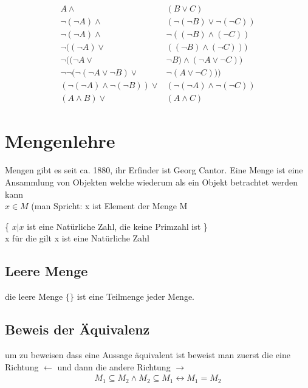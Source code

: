 \documentclass[a4paper]{scrartcl}
\begin{document}
\begin{align*}
A \wedge& (B \vee C) \\
\neg (\neg A) \wedge& (\neg(\neg B) \vee \neg(\neg C ) ) \\
\neg (\neg A) \wedge& \neg((\neg B) \wedge (\neg C ) ) \\
\neg ((\neg A) \vee& ((\neg B) \wedge (\neg C ) ) ) \\
\neg ((\neg A \vee& \neg B) \wedge (\neg A \vee \neg C ) ) \\
\neg \neg ( \neg (\neg A \vee \neg B) \vee& \neg( A \vee \neg C) ) ) \\ 
(\neg (\neg A) \wedge \neg (\neg B) ) \vee& (\neg(\neg A) \wedge \neg (\neg C) ) \\
(A \wedge B) \vee& (A \wedge C)
\end{align*}

\newpage

\section{Mengenlehre}
Mengen gibt es seit ca. 1880, ihr Erfinder ist Georg Cantor. Eine Menge ist eine Ansammlung von Objekten welche wiederum als ein Objekt betrachtet werden kann \\
$x \in M$ (man Spricht: x ist Element der Menge M \\
\begin{center}
\{ $x | x$ ist eine Natürliche Zahl, die keine Primzahl ist \} \\
x für die gilt x ist eine Natürliche Zahl \\
\end{center}


\subsection{Leere Menge}
die leere Menge $\{ \}$ ist eine Teilmenge jeder Menge.

\subsection{Beweis der Äquivalenz}
um zu beweisen dass eine Aussage äquivalent ist beweist man zuerst die eine Richtung $ \leftarrow$ und dann die andere Richtung $\rightarrow$ \\
\begin{align}
M_1 \subseteq M_2 \wedge M_2 \subseteq M_1 \leftrightarrow M_1 = M_2 
\end{align}
\end{document}
